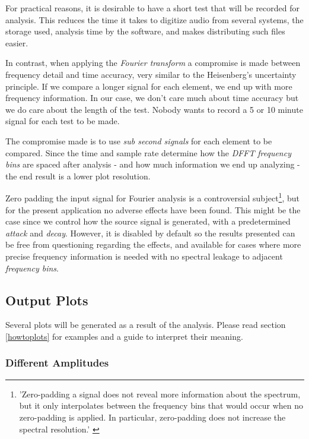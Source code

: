 \documentclass[10pt,a4paper]{report}
\begin{document}
For practical reasons, it is desirable to have a short test that will be recorded for analysis. This reduces the time it takes to digitize audio from several systems, the storage used, analysis time by the software, and makes distributing such files easier.

In contrast, when applying the \textit{Fourier transform} a compromise is made between frequency detail and time accuracy, very similar to the Heisenberg's uncertainty principle. If we compare a longer signal for each element, we end up with more frequency information. In our case, we don't care much about time accuracy but we do care about the length of the test. Nobody wants to record a 5 or 10 minute signal for each test to be made.

The compromise made is to use \textit{sub second signals} for each element to be compared. Since the time and sample rate determine how the \textit{DFFT} \textit{frequency bins} are spaced after analysis - and how much information we end up analyzing - the end result is a lower plot resolution.

Zero padding the input signal for Fourier analysis is a controversial subject\footnote{'Zero-padding a signal does not reveal more information about the spectrum, but it only interpolates between the frequency bins that would occur when no zero-padding is applied. In particular, zero-padding does not increase the spectral resolution.' \cite{zeropaddinginterpolate} \cite{ZeroPaddingBad}}, but for the present application no adverse effects have been found. This might be the case since we control how the source signal is generated, with a predetermined \textit{attack} and \textit{decay}. However, it is disabled by default so the results presented can be free from questioning regarding the effects, and available for cases where more precise frequency information is needed with no spectral leakage to adjacent \textit{frequency bins}.

\subsection{Output Plots}
\label{outputfiles}

Several plots will be generated as a result of the analysis. Please read section \ref{howtoplots} for examples and a guide to interpret their meaning.

\subsubsection{Different Amplitudes}
\end{document}
